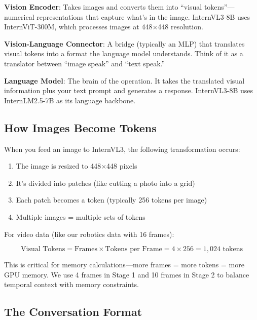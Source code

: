 \documentclass[11pt,a4paper]{article}
\begin{document}
\textbf{Vision Encoder}: Takes images and converts them into ``visual tokens''---numerical representations that capture what's in the image. InternVL3-8B uses InternViT-300M, which processes images at 448$\times$448 resolution.

\textbf{Vision-Language Connector}: A bridge (typically an MLP) that translates visual tokens into a format the language model understands. Think of it as a translator between ``image speak'' and ``text speak.''

\textbf{Language Model}: The brain of the operation. It takes the translated visual information plus your text prompt and generates a response. InternVL3-8B uses InternLM2.5-7B as its language backbone.

\subsection{How Images Become Tokens}

When you feed an image to InternVL3, the following transformation occurs:

\begin{enumerate}
    \item The image is resized to 448$\times$448 pixels
    \item It's divided into patches (like cutting a photo into a grid)
    \item Each patch becomes a token (typically 256 tokens per image)
    \item Multiple images = multiple sets of tokens
\end{enumerate}

For video data (like our robotics data with 16 frames):

\begin{equation}
\text{Visual Tokens} = \text{Frames} \times \text{Tokens per Frame} = 4 \times 256 = 1,024 \text{ tokens}
\end{equation}

\begin{warningbox}
This is critical for memory calculations---more frames = more tokens = more GPU memory. We use 4 frames in Stage 1 and 10 frames in Stage 2 to balance temporal context with memory constraints.
\end{warningbox}

\subsection{The Conversation Format}
\end{document}
